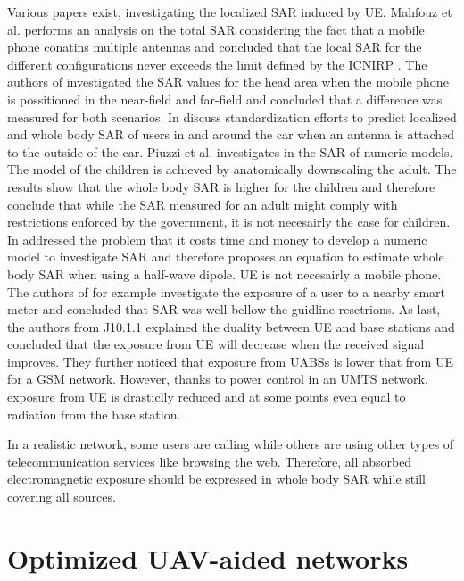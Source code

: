 Various papers exist, investigating the localized \gls{SAR} induced by \gls{UE}.
Mahfouz et al. performs an analysis on the total \gls{SAR} considering the fact that a mobile phone conatins multiple antennas and
concluded that the local \gls{SAR} for the different configurations never exceeds the limit defined by the \gls{ICNIRP} \cite{P3}.
The authors of \cite{P5} investigated the \gls{SAR} values for the head area when the mobile phone is possitioned in the near-field and 
far-field and concluded that a difference was measured for both scenarios.  In \cite{P7} discuss standardization efforts  to predict
 localized and whole body \gls{SAR} of users in and around the car when an antenna is attached to the outside of the car.
 Piuzzi et al. investigates in \cite{P8} the \gls{SAR} of numeric models. The model of the children is achieved by anatomically downscaling the adult.
 The results show that the whole body \gls{SAR} is higher for the children and therefore conclude that while the \gls{SAR} measured for an adult 
 might comply with restrictions enforced by the government, it is not necesairly the case for children. In \cite{P10} addressed the problem 
 that it costs time and money to develop a numeric model to investigate \gls{SAR} and therefore proposes an equation to 
 estimate whole body \gls{SAR} when using a half-wave dipole. \gls{UE} is not necesairly a mobile phone. The authors of \cite{P11} for example
 investigate the exposure of a user to a nearby smart meter and concluded that \gls{SAR} was well bellow the guidline resctrions. 
 As last, the authors from \gls{J10.1.1} explained the duality between \gls{UE} and base stations and concluded that the exposure 
 from \gls{UE} will decrease when the received signal improves. They further noticed that 
 exposure from \gls{UABS}s is lower that from \gls{UE} for a \gls{GSM} network. However, thanks to power control in an \gls{UMTS} network,
 exposure from \gls{UE} is drasticlly reduced and at some points even equal to radiation from the base station.

In a realistic network, some users are calling while others are using other types of telecommunication services like browsing the web.
Therefore, all absorbed electromagnetic exposure should be expressed in whole body SAR while still covering all sources.

\section{Optimized UAV-aided networks}

